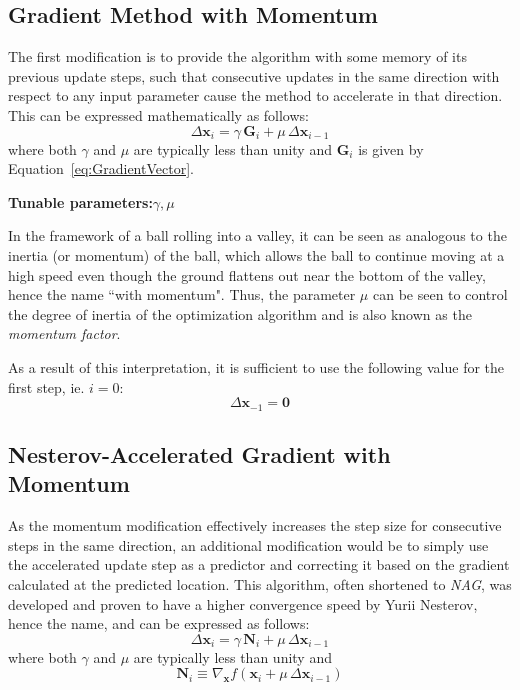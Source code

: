 \documentclass{article}
\begin{document}
\subsection{Gradient Method with Momentum}
\label{subsec:Momentum}

The first modification is to provide the algorithm with some memory of its previous update steps, such that consecutive updates in the same direction with respect to any input parameter cause the method to accelerate in that direction. This can be expressed mathematically as follows:
\begin{equation}
\label{eq:SE_Momentum}
	\Delta \mathbf{x}_i = \gamma \, \mathbf{G}_i + \mu \, \Delta \mathbf{x}_{i-1}
\end{equation}
where both $\gamma$ and $\mu$ are typically less than unity and $\mathbf{G}_i$ is given by Equation~\eqref{eq:GradientVector}.

\begin{center}
	\textbf{Tunable parameters:}\hspace{20pt}$\gamma,\mu$
\end{center}

In the framework of a ball rolling into a valley, it can be seen as analogous to the inertia (or momentum) of the ball, which allows the ball to continue moving at a high speed even though the ground flattens out near the bottom of the valley, hence the name ``with momentum". Thus, the parameter $\mu$ can be seen to control the degree of inertia of the optimization algorithm and is also known as the \emph{momentum factor}.

As a result of this interpretation, it is sufficient to use the following value for the first step, ie. $i=0$:
\begin{equation}
\label{eq:MomentumFirstUpdate}
	\Delta \mathbf{x}_{-1} = \mathbf{0}
\end{equation}

\subsection{Nesterov-Accelerated Gradient with Momentum}
\label{subsec:NAGradAscent}

As the momentum modification effectively increases the step size for consecutive steps in the same direction, an additional modification would be to simply use the accelerated update step as a predictor and correcting it based on the gradient calculated at the predicted location. This algorithm, often shortened to \emph{NAG}, was developed and proven to have a higher convergence speed by Yurii Nesterov, hence the name, and can be expressed as follows:
\begin{equation}
\label{eq:SE_NAG}
	\Delta \mathbf{x}_i = \gamma \, \mathbf{N}_i + \mu \, \Delta \mathbf{x}_{i-1}
\end{equation}
where both $\gamma$ and $\mu$ are typically less than unity and 
\begin{equation}
\label{eq:NesterovUpdate}
	\mathbf{N}_i \equiv \nabla_{\mathbf{x}} f\!\left(\mathbf{x}_i + \mu \, \Delta \mathbf{x}_{i-1}\right)
\end{equation}
\end{document}
